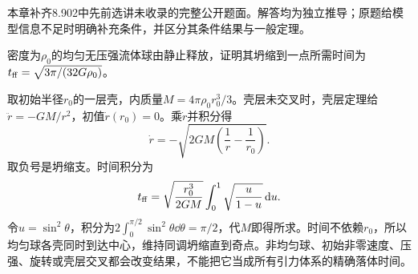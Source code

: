 本章补齐8.902中先前选讲未收录的完整公开题面。解答均为独立推导；原题给模型信息不足时明确补充条件，并区分其条件结果与一般定理。

\begin{exercise}
密度为$\rho_0$的均匀无压强流体球由静止释放，证明其坍缩到一点所需时间为$t_{ \rm ff}=\sqrt{3\pi/(32G\rho_0)}$。
\end{exercise}
\begin{solution}
取初始半径$r_0$的一层壳，内质量$M=4\pi\rho_0r_0^3/3$。壳层未交叉时，壳层定理给$\ddot r=-GM/r^2$，初值$\dot r(r_0)=0$。乘$\dot r$并积分得
\[
 \dot r=-\sqrt{2GM\left(\frac1r-\frac1{r_0}\right)}.
\]
取负号是坍缩支。时间积分为
\[
 t_{ \rm ff}=\sqrt{\frac{r_0^3}{2GM}}\int_0^1\sqrt{\frac u{1-u}}\,\mathrm d u.
\]
令$u=\sin^2\theta$，积分为$2\int_0^{\pi/2}\sin^2\theta\dd\theta=\pi/2$，代$M$即得所求。时间不依赖$r_0$，所以均匀球各壳同时到达中心，维持同调坍缩直到奇点。非均匀球、初始非零速度、压强、旋转或壳层交叉都会改变结果，不能把它当成所有引力体系的精确落体时间。
\end{solution}

